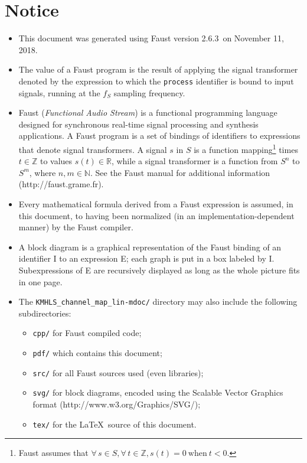 \documentclass{article}
\newcommand{\faustdocdir}{KMHLS\_channel\_map\_lin-mdoc}
\newcommand{\faustversion}{2.6.3}
\newcommand{\faustdocdate}{November 11, 2018}
\begin{document}
 \section{Notice} \label{notice}  
\begin{itemize}
	\item This document was generated using Faust version \faustversion\ on \faustdocdate.
	\item The value of a Faust program is the result of applying the signal transformer denoted by the expression to which the \texttt{process} identifier is bound to input signals, running at the $f_S$ sampling frequency.
	\item Faust (\emph{Functional Audio Stream}) is a functional programming language designed for synchronous real-time signal processing and synthesis applications. A Faust program is a set of bindings of identifiers to expressions that denote signal transformers. A signal $s$ in $S$ is a function mapping\footnote{Faust assumes that $\forall \, s \in S, \forall \, t \in \mathbb{Z}, s(t) = 0 \mathrm{\ when\ } t < 0$.} times $t \in \mathbb{Z}$ to values $s(t) \in \mathbb{R}$, while a signal transformer is a function from $S^n$ to $S^m$, where $n,m\in \mathbb{N}$. See the Faust manual for additional information (\textsf{http://faust.grame.fr}).
	\item Every mathematical formula derived from a Faust expression is assumed, in this document, to having been normalized (in an implementation-depen\-dent manner) by the Faust compiler.
	\item A block diagram is a graphical representation of the Faust binding of an identifier I to an expression E; each graph is put in a box labeled by I. Subexpressions of E are recursively displayed as long as the whole picture fits in one page.
	\item The \texttt{\faustdocdir/} directory may also include the following subdirectories:
\begin{itemize}
	\item	\texttt{cpp/} for Faust compiled code; 
	\item	\texttt{pdf/} which contains this document; 
	\item	\texttt{src/} for all Faust sources used (even libraries); 
	\item	\texttt{svg/} for block diagrams, encoded using the Scalable Vector Graphics format (\textsf{http://www.w3.org/Graphics/SVG/});
	\item	\texttt{tex/} for the \LaTeX\ source of this document.
\end{itemize}
\end{itemize}
\end{document}
